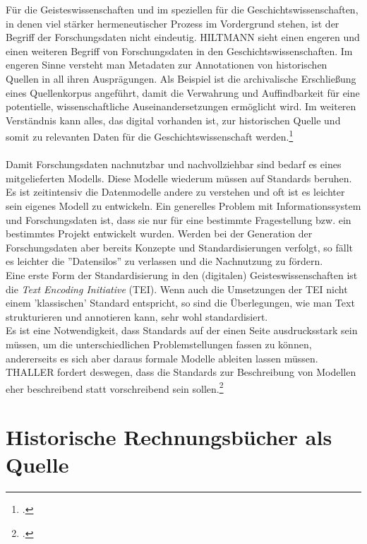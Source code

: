 \documentclass[12pt,a4paper]{article}
\begin{document}
Für die Geisteswissenschaften und im speziellen für die Geschichtswissenschaften, in denen viel stärker hermeneutischer Prozess im Vordergrund stehen, ist der Begriff der Forschungsdaten nicht eindeutig. HILTMANN sieht einen engeren und einen weiteren Begriff von Forschungsdaten in den Geschichtswissenschaften. Im engeren Sinne versteht man Metadaten zur Annotationen von historischen Quellen in all ihren Ausprägungen. Als Beispiel ist die archivalische Erschließung eines Quellenkorpus angeführt, damit die Verwahrung und Auffindbarkeit für eine potentielle, wissenschaftliche Auseinandersetzungen ermöglicht wird. Im weiteren Verständnis kann alles, das digital vorhanden ist, zur historischen Quelle und somit zu relevanten Daten für die Geschichtswissenschaft werden.\footcite[Vgl.][09.06.2019.]{hiltman2018forschungsdaten}
\\
\\
Damit Forschungsdaten nachnutzbar und nachvollziehbar sind bedarf es eines mitgelieferten Modells. Diese Modelle wiederum müssen auf Standards beruhen. Es ist zeitintensiv die Datenmodelle andere zu verstehen und oft ist es leichter sein eigenes Modell zu entwickeln. Ein generelles Problem mit Informationssystem und Forschungsdaten ist, dass sie nur für eine bestimmte Fragestellung bzw. ein bestimmtes Projekt entwickelt wurden. Werden bei der Generation der Forschungsdaten aber bereits Konzepte und Standardisierungen verfolgt, so fällt es leichter die ''Datensilos'' zu verlassen und die Nachnutzung zu fördern. 
\\
Eine erste Form der Standardisierung in den (digitalen) Geisteswissenschaften ist die \textit{Text Encoding Initiative} (TEI). Wenn auch die Umsetzungen der TEI nicht einem 'klassischen' Standard entspricht, so sind die Überlegungen, wie man Text strukturieren und annotieren kann, sehr wohl standardisiert. 
\\
Es ist eine Notwendigkeit, dass Standards auf der einen Seite ausdrucksstark sein müssen, um die unterschiedlichen Problemstellungen fassen zu können, andererseits es sich aber daraus formale Modelle ableiten lassen müssen. THALLER fordert deswegen, dass die Standards zur Beschreibung von Modellen eher beschreibend statt vorschreibend sein sollen.\footcite[][S.204]{thaller2017need}


\newpage
\section{Historische Rechnungsbücher als Quelle}
\label{ref:Rechnung}
\end{document}
